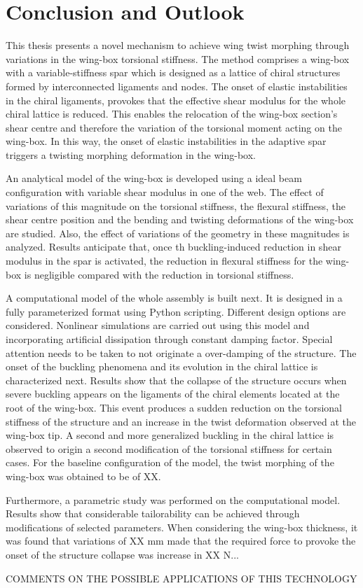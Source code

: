 \chapter{Conclusion and Outlook} \label{chap:summary}
%
%

This thesis presents a novel mechanism to achieve wing twist morphing through variations in the wing-box torsional stiffness. The method comprises a wing-box with a variable-stiffness spar which is designed as a lattice of chiral structures formed by interconnected ligaments and nodes. The onset of elastic instabilities in the chiral ligaments, provokes that the effective shear modulus for the whole chiral lattice is reduced. This enables the relocation of the wing-box section's shear centre and therefore the variation of the torsional moment acting on the wing-box. In this way, the onset of elastic instabilities in the adaptive spar triggers a twisting morphing deformation in the wing-box.

An analytical model of the wing-box is developed using a ideal beam configuration with variable shear modulus in one of the web. The effect of variations of this magnitude on the torsional stiffness, the flexural stiffness, the shear centre position and the bending and twisting deformations of the wing-box are studied. Also, the effect of variations of the geometry in these magnitudes is analyzed. Results anticipate that, once th buckling-induced reduction in shear modulus in the spar is activated, the reduction in flexural stiffness for the wing-box is negligible compared with the reduction in torsional stiffness. 

A computational model of the whole assembly is built next. It is designed in a fully parameterized format using Python scripting. Different design options are considered. Nonlinear simulations are carried out using this model and incorporating artificial dissipation through constant damping factor. Special attention needs to be taken to not originate a over-damping of the structure. The onset of the buckling phenomena and its evolution in the chiral lattice is characterized next. Results show that the collapse of the structure occurs when severe buckling appears on the ligaments of the chiral elements located at the root of the wing-box. This event produces a sudden reduction on the torsional stiffness of the structure and an increase in the twist deformation observed at the wing-box tip. A second and more generalized buckling in the chiral lattice is observed to origin a second modification of the torsional stiffness for certain cases. For the baseline configuration of the model, the twist morphing of the wing-box was obtained to be of XX.

Furthermore, a parametric study was performed on the computational model. Results show that considerable tailorability can be achieved through modifications of selected parameters. When considering the wing-box thickness, it was found that variations of XX mm made that the required force to provoke the onset of the structure collapse was increase in XX N...

COMMENTS ON THE POSSIBLE APPLICATIONS OF THIS TECHNOLOGY

